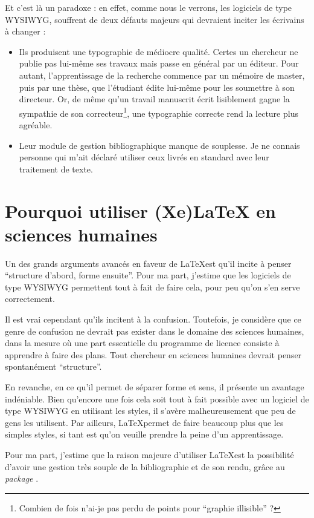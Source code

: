 Et c'est là un paradoxe : en effet, comme nous le verrons, les logiciels de type WYSIWYG, souffrent de deux défauts majeurs qui devraient inciter les écrivains à changer :
\begin{itemize}
\item Ils produisent une typographie de médiocre qualité. Certes un chercheur ne publie pas lui-même ses travaux mais passe en général par un éditeur. Pour autant, l'apprentissage de la recherche commence par un mémoire de master, puis par une thèse, que l'étudiant édite lui-même pour les soumettre à son directeur. Or, de même qu'un travail manuscrit écrit lisiblement gagne la sympathie de son correcteur\footnote{Combien de fois n'ai-je pas perdu de points pour \enquote{graphie illisible} ?},  une typographie correcte rend la lecture plus agréable.
\item Leur module de gestion bibliographique manque de souplesse. Je ne connais personne qui m'ait déclaré utiliser ceux livrés en standard avec leur traitement de texte.
\end{itemize}

\section{Pourquoi utiliser (Xe)\LaTeX{} en sciences humaines}

Un des grands arguments avancés en faveur de \LaTeX est qu'il incite à penser \enquote{structure d'abord, forme ensuite}. Pour ma part, j'estime que les logiciels de type WYSIWYG permettent tout à fait de faire cela, pour peu qu'on s'en serve correctement. 

Il est vrai cependant qu'ils incitent à la confusion. Toutefois, je considère que ce genre de confusion ne devrait pas exister dans le domaine des sciences humaines, dans la mesure où une part essentielle du programme de licence consiste à apprendre à faire des plans. Tout chercheur en sciences humaines devrait penser spontanément \enquote{structure}.

En revanche, en ce qu'il permet de séparer forme et sens, il présente un avantage indéniable. Bien qu'encore une fois cela soit tout à fait possible avec un logiciel de type WYSIWYG en utilisant les styles,  il s'avère malheureusement que peu de gens les utilisent. Par ailleurs, \LaTeX permet de faire beaucoup plus que les simples styles, si tant est qu'on veuille prendre la peine d'un apprentissage.

Pour ma part, j'estime que la raison majeure d'utiliser \LaTeX est la possibilité d'avoir une gestion très souple de la bibliographie et de son rendu, grâce au \emph{package} . 

